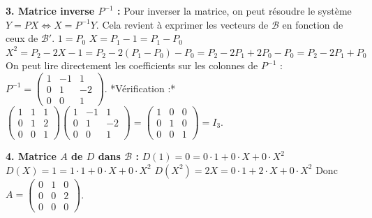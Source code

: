 \documentclass{report}
\begin{document}
\textbf{3. Matrice inverse $P^{-1}$ :}
Pour inverser la matrice, on peut résoudre le système $Y = P X \iff X = P^{-1} Y$. Cela revient à exprimer les vecteurs de $\mathcal{B}$ en fonction de ceux de $\mathcal{B}'$.
$1 = P_0$
$X = P_1 - 1 = P_1 - P_0$
$X^2 = P_2 - 2X - 1 = P_2 - 2(P_1 - P_0) - P_0 = P_2 - 2P_1 + 2P_0 - P_0 = P_2 - 2P_1 + P_0$
On peut lire directement les coefficients sur les colonnes de $P^{-1}$ :
$P^{-1} = \begin{pmatrix} 1 & -1 & 1 \\ 0 & 1 & -2 \\ 0 & 0 & 1 \end{pmatrix}$.
*Vérification :* $\begin{pmatrix} 1 & 1 & 1 \\ 0 & 1 & 2 \\ 0 & 0 & 1 \end{pmatrix} \begin{pmatrix} 1 & -1 & 1 \\ 0 & 1 & -2 \\ 0 & 0 & 1 \end{pmatrix} = \begin{pmatrix} 1 & 0 & 0 \\ 0 & 1 & 0 \\ 0 & 0 & 1 \end{pmatrix} = I_3$.

\textbf{4. Matrice $A$ de $D$ dans $\mathcal{B}$ :}
$D(1) = 0 = 0 \cdot 1 + 0 \cdot X + 0 \cdot X^2$
$D(X) = 1 = 1 \cdot 1 + 0 \cdot X + 0 \cdot X^2$
$D(X^2) = 2X = 0 \cdot 1 + 2 \cdot X + 0 \cdot X^2$
Donc $A = \begin{pmatrix} 0 & 1 & 0 \\ 0 & 0 & 2 \\ 0 & 0 & 0 \end{pmatrix}$.
\end{document}

